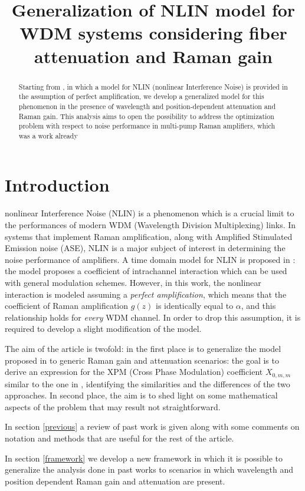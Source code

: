 \documentclass[10pt, lettersize, journal, onecolumn]{IEEEtran}
\title{Generalization of NLIN model for WDM systems considering fiber attenuation and Raman gain}
\begin{document}
\maketitle


\begin{abstract}
Starting from \cite{Dar_2013}, in which a model for NLIN (nonlinear Interference Noise) is provided in the assumption of perfect amplification, we develop a generalized model for this phenomenon in the presence of wavelength and position-dependent attenuation and Raman gain. This analysis aims to open the possibility to address the optimization problem with respect to noise performance in multi-pump Raman amplifiers, which was a work already 
\end{abstract}
\section{Introduction}
nonlinear Interference Noise (NLIN) is a phenomenon which is a crucial limit to the performances of modern WDM (Wavelength Division Multiplexing) links. In systems that implement Raman amplification, along with Amplified Stimulated Emission noise (ASE), NLIN is a major subject of interest in determining the noise performance of amplifiers. A time domain model for NLIN is proposed in \cite{Dar_2013}: the model proposes a coefficient of intrachannel interaction which can be used with general modulation schemes. However, in this work, the nonlinear interaction is modeled assuming a \textit{perfect amplification}, which means that the coefficient of Raman amplification $g(z)$ is identically equal to $\alpha$, and this relationship holds for \textit{every} WDM channel.
In order to drop this assumption, it is required to develop a slight modification of the model.

The aim of the article is twofold: in the first place is to generalize the model proposed in \cite{Dar_2013} to generic Raman gain and attenuation scenarios: the goal is to derive an expression for the XPM (Cross Phase Modulation) coefficient $X_{0, m, m}$ similar to the one in \cite{Dar_2013}, identifying the similarities and the differences of the two approaches.
In second place, the aim is to shed light on some mathematical aspects of the problem that may result not straightforward.

In section \ref{previous} a review of past work is given along with some comments on notation and methods that are useful for the rest of the article.

In section \ref{framework} we develop a new framework in which it is possible to generalize the analysis done in past works to scenarios in which wavelength and position dependent Raman gain and attenuation are present.
\end{document}
